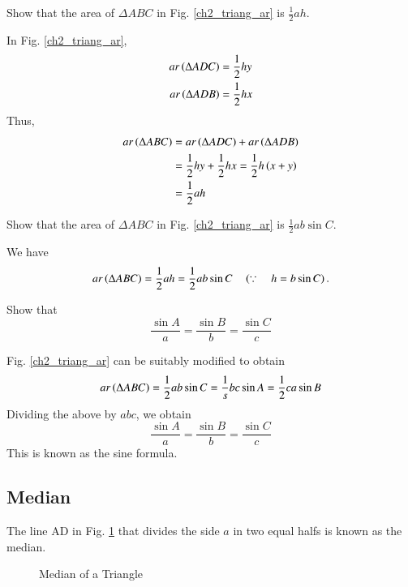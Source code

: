 \begin{problem}
	Show that the area of $\Delta ABC$ in Fig. 	\ref{ch2_triang_ar}	is $\frac{1}{2}ah$.
\end{problem}

\proof In Fig. \ref{ch2_triang_ar},
\begin{align}
ar\left(\Delta ADC\right) &= \frac{1}{2}hy \\
ar\left(\Delta ADB\right) &= \frac{1}{2}hx 
\end{align}
Thus,
\begin{align}
ar\left(\Delta ABC\right) &= ar\left(\Delta ADC\right) + ar\left(\Delta ADB\right) \\
&= \frac{1}{2}hy + \frac{1}{2}hx = \frac{1}{2}h\left(x+y\right) \\
&= \frac{1}{2}ah
\end{align}
\begin{problem}
	Show that the area of $\Delta ABC$ in Fig. 	\ref{ch2_triang_ar}	is $\frac{1}{2}ab \sin C$.
\end{problem}
\proof We have
%
\begin{equation}
ar\left(\Delta ABC\right) = \frac{1}{2}ah = \frac{1}{2}ab\sin C \quad \left(\because \quad h = b \sin C\right).
\end{equation}
%
\begin{problem}
	Show that 
	\begin{equation}
	\frac{\sin A}{a} = \frac{\sin B}{b} = \frac{\sin C}{c}
	\end{equation}
\end{problem}
\proof Fig. \ref{ch2_triang_ar} can be suitably modified to obtain 
\begin{equation}
ar\left(\Delta ABC\right) = \frac{1}{2}ab\sin C = \frac{1}{s}bc\sin A = \frac{1}{2}ca\sin B
\end{equation}
Dividing the above by $abc$, we obtain
	\begin{equation}
	\frac{\sin A}{a} = \frac{\sin B}{b} = \frac{\sin C}{c}
	\end{equation}
This is known as the sine formula.	
%
\subsection{Median}
\begin{definition}
	The line AD in Fig. \ref{ch2_median_def} that divides the side $a$ in two equal halfs is known as the median.
\end{definition}
\begin{figure}[!h]
	\begin{center}
		
		\resizebox{\columnwidth}{!}{}
	\end{center}
	\caption{Median of a Triangle}
	\label{ch2_median_def}	
\end{figure}

